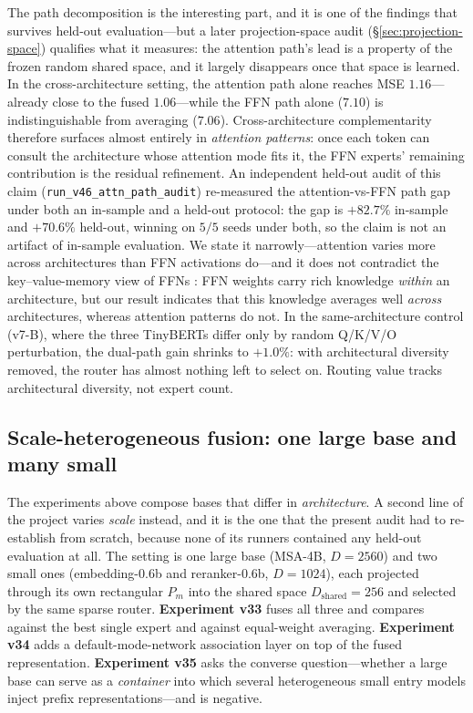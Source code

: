 \documentclass[10pt]{article}
\theoremstyle{definition}
\theoremstyle{plain}
\theoremstyle{remark}
\begin{document}
The path decomposition is the interesting part, and it is one of the findings that survives held-out evaluation---but a later projection-space audit (\S\ref{sec:projection-space}) qualifies what it measures: the attention path's lead is a property of the frozen random shared space, and it largely disappears once that space is learned. In the cross-architecture setting, the attention path alone reaches MSE $1.16$---already close to the fused $1.06$---while the FFN path alone ($7.10$) is indistinguishable from averaging ($7.06$). Cross-architecture complementarity therefore surfaces almost entirely in \emph{attention patterns}: once each token can consult the architecture whose attention mode fits it, the FFN experts' remaining contribution is the residual refinement. An independent held-out audit of this claim (\texttt{run\_v46\_attn\_path\_audit}) re-measured the attention-vs-FFN path gap under both an in-sample and a held-out protocol: the gap is $+82.7\%$ in-sample and $+70.6\%$ held-out, winning on $5/5$ seeds under both, so the claim is not an artifact of in-sample evaluation. We state it narrowly---attention varies more across architectures than FFN activations do---and it does not contradict the key--value-memory view of FFNs \citep{geva2021,meng2022,dai2022}: FFN weights carry rich knowledge \emph{within} an architecture, but our result indicates that this knowledge averages well \emph{across} architectures, whereas attention patterns do not. In the same-architecture control (v7-B), where the three TinyBERTs differ only by random Q/K/V/O perturbation, the dual-path gain shrinks to $+1.0\%$: with architectural diversity removed, the router has almost nothing left to select on. Routing value tracks architectural diversity, not expert count.

\subsection{Scale-heterogeneous fusion: one large base and many small}
\label{sec:scale-hetero-exp}

The experiments above compose bases that differ in \emph{architecture}. A second line of the project
varies \emph{scale} instead, and it is the one that the present audit had to re-establish from
scratch, because none of its runners contained any held-out evaluation at all. The setting is one
large base (MSA-4B, $D=2560$) and two small ones (embedding-0.6b and reranker-0.6b, $D=1024$),
each projected through its own rectangular $P_m$ into the shared space $D_{\text{shared}}{=}256$ and
selected by the same sparse router. \textbf{Experiment v33} fuses all three and compares against the
best single expert and against equal-weight averaging. \textbf{Experiment v34} adds a
default-mode-network association layer on top of the fused representation. \textbf{Experiment v35}
asks the converse question---whether a large base can serve as a \emph{container} into which several
heterogeneous small entry models inject prefix representations---and is negative.
\end{document}
